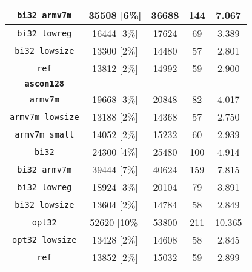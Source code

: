 \begin{table}[h]
\begin{adjustbox}{width=300pt}
\begin{tabular}{|c|c|c|c|c|}
        \hline
        \texttt{bi32 armv7m} & 35508 [6\%] & 36688 & 144 & 7.067 \\
        \hline
        \texttt{bi32 lowreg} & 16444 [3\%] & 17624 & 69 & 3.389 \\
        \hline
        \texttt{bi32 lowsize} & 13300 [2\%] & 14480 & 57 & 2.801 \\
        \hline
        \texttt{ref} & 13812 [2\%] & 14992 & 59 & 2.900 \\
        \hline
        \texttt{\textbf{ascon128}} & & & & \\
        \hline
        \texttt{armv7m} & 19668 [3\%] & 20848 & 82 & 4.017 \\
        \hline
        \texttt{armv7m lowsize} & 13188 [2\%] & 14368 & 57 & 2.750 \\
        \hline
        \texttt{armv7m small} & 14052 [2\%] & 15232 & 60 & 2.939 \\
        \hline
        \texttt{bi32} & 24300 [4\%] & 25480 & 100 & 4.914 \\
        \hline
        \texttt{bi32 armv7m} & 39444 [7\%] & 40624 & 159 & 7.815 \\
        \hline
        \texttt{bi32 lowreg} & 18924 [3\%] & 20104 & 79 & 3.891 \\
        \hline
        \texttt{bi32 lowsize} & 13604 [2\%] & 14784 & 58 & 2.849 \\
        \hline
        \texttt{opt32} & 52620 [10\%] & 53800 & 211 & 10.365 \\
        \hline
        \texttt{opt32 lowsize} & 13428 [2\%] & 14608 & 58 & 2.845 \\
        \hline
        \texttt{ref} & 13852 [2\%] & 15032 & 59 & 2.899 \\
        \hline
    \end{tabular}
    \end{adjustbox}
\end{table}

